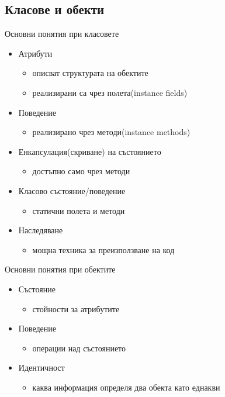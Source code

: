 \documentclass{beamer}
\begin{document}
\subsection{Класове и обекти}
\begin{frame}{Основни понятия при класовете}
  \transdissolve
  \begin{itemize}
  \item Атрибути
    \begin{itemize}
    \item описват структурата на обектите \pause
    \item реализирани са чрез полета(instance fields) \pause
    \end{itemize}
  \item Поведение \pause
    \begin{itemize}
    \item реализирано чрез методи(instance methods) \pause
    \end{itemize}
  \item Енкапсулация(скриване) на състоянието  \pause
    \begin{itemize}
    \item достъпно само чрез методи \pause
    \end{itemize}
  \item Класово състояние/поведение \pause
    \begin{itemize}
    \item статични полета и методи \pause
    \end{itemize}
  \item Наследяване
    \begin{itemize}
      \item мощна техника за преизползване на код
    \end{itemize}

  \end{itemize}
\end{frame}

\begin{frame}{Основни понятия при обектите}
  \transdissolve
  \begin{itemize}
  \item Състояние \pause
    \begin{itemize}
    \item стойности за атрибутите \pause
    \end{itemize}
  \item Поведение \pause
    \begin{itemize}
    \item операции над състоянието \pause
    \end{itemize}
  \item Идентичност \pause
    \begin{itemize}
    \item каква информация определя два обекта като еднакви
    \end{itemize}
  \end{itemize}
\end{frame}
\end{document}
